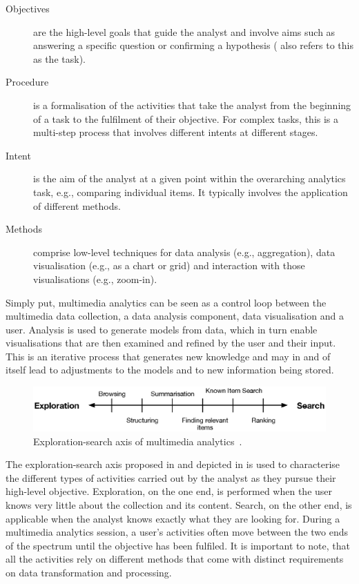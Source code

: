 \begin{description}
    \item[Objectives] are the high-level goals that guide the analyst and involve aims such as answering a specific question or confirming a hypothesis (\cite{Seebacher:2017Visual} also refers to this as the task).
    \item[Procedure] is a formalisation of the activities that take the analyst from the beginning of a task to the fulfilment of their objective. For complex tasks, this is a multi-step process that involves different intents at different stages.
    \item[Intent] is the aim of the analyst at a given point within the overarching analytics task, e.g., comparing individual items. It typically involves the application of different methods.
    \item[Methods] comprise low-level techniques for data analysis (e.g., aggregation), data visualisation (e.g., as a chart or grid) and interaction with those visualisations (e.g., zoom-in).
\end{description}

Simply put, multimedia analytics can be seen as a control loop between the multimedia data collection, a data analysis component, data visualisation and a user. Analysis is used to generate models from data, which in turn enable visualisations that are then examined and refined by the user and their input. This is an iterative process that generates new knowledge and may in and of itself lead to adjustments to the models and to new information being stored.

\begin{figure}[h]
    \centering
    \includegraphics[width=\textwidth]{figures/exploration_search_axis.eps}
    \caption{Exploration-search axis of multimedia analytics~\cite{Zahalka:2014Towards}.}
    \label{figure:exploration-search-axis}
\end{figure}

The exploration-search axis proposed in \cite{Zahalka:2014Towards} and depicted in  is used to characterise the different types of activities carried out by the analyst as they pursue their high-level objective. Exploration, on the one end, is performed when the user knows very little about the collection and its content. Search, on the other end, is applicable when the analyst knows exactly what they are looking for. During a multimedia analytics session, a user's activities often move between the two ends of the spectrum until the objective has been fulfiled. It is important to note, that all the activities rely on different methods that come with distinct requirements on data transformation and processing.

